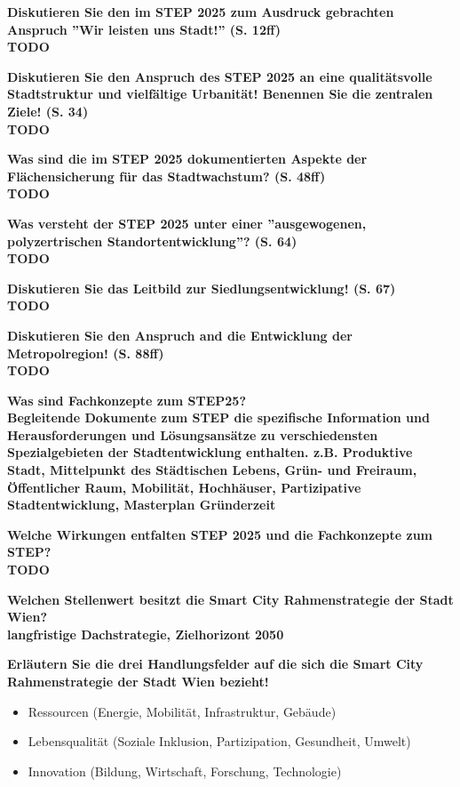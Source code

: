 \documentclass[]{article}
\newenvironment{question}{\vspace{8mm}\noindent\bfseries}{\\}
\begin{document}
\begin{question}
	Diskutieren Sie den im STEP 2025 zum Ausdruck gebrachten Anspruch ''Wir leisten uns Stadt!'' (S. 12ff)
\end{question}
TODO

\begin{question}
	Diskutieren Sie den Anspruch des STEP 2025 an eine qualitätsvolle Stadtstruktur und vielfältige Urbanität! Benennen Sie die zentralen Ziele! (S. 34)
\end{question}
TODO

\begin{question}
	Was sind die im STEP 2025 dokumentierten Aspekte der Flächensicherung für das Stadtwachstum? (S. 48ff)
\end{question}
TODO

\begin{question}
	Was versteht der STEP 2025 unter einer ''ausgewogenen, polyzertrischen Standortentwicklung''? (S. 64)
\end{question}
TODO

\begin{question}
	Diskutieren Sie das Leitbild zur Siedlungsentwicklung! (S. 67)
\end{question}
TODO

\begin{question}
	Diskutieren Sie den Anspruch and die Entwicklung der Metropolregion! (S. 88ff)
\end{question}
TODO

\begin{question}
	Was sind Fachkonzepte zum STEP25?
\end{question}
Begleitende Dokumente zum STEP die spezifische Information und Herausforderungen und Lösungsansätze zu verschiedensten Spezialgebieten der Stadtentwicklung enthalten. z.B. Produktive Stadt, Mittelpunkt des Städtischen Lebens, Grün- und Freiraum, Öffentlicher Raum, Mobilität, Hochhäuser, Partizipative Stadtentwicklung, Masterplan Gründerzeit

\begin{question}
	Welche Wirkungen entfalten STEP 2025 und die Fachkonzepte zum STEP?
\end{question}
TODO

\begin{question}
	Welchen Stellenwert besitzt die Smart City Rahmenstrategie der Stadt Wien?
\end{question}
langfristige Dachstrategie, Zielhorizont 2050

\begin{question}
	Erläutern Sie die drei Handlungsfelder auf die sich die Smart City Rahmenstrategie der Stadt Wien bezieht!
\end{question}
\begin{itemize}
	\item Ressourcen (Energie, Mobilität, Infrastruktur, Gebäude)
	\item Lebensqualität (Soziale Inklusion, Partizipation, Gesundheit, Umwelt)
	\item Innovation (Bildung, Wirtschaft, Forschung, Technologie)
\end{itemize}
\end{document}
